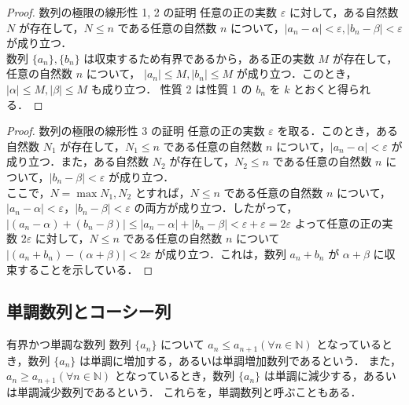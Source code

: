 \documentclass[a4paper]{ltjsarticle}
\begin{document}
  \begin{proof}{数列の極限の線形性 1, 2 の証明}{}
   任意の正の実数 $\varepsilon$ に対して，ある自然数 $N$ が存在して，$N \leq n$ である任意の自然数 $n$ について，$|a_n - \alpha| < \varepsilon, |b_n - \beta| < \varepsilon$ が成り立つ．
   \\
   数列 $\{a_n\}, \{b_n\}$ は収束するため有界であるから，ある正の実数 $M$ が存在して，任意の自然数 $n$ について， $|a_n| \leq M, |b_n| \leq M$ が成り立つ．このとき，$|\alpha| \leq M, |\beta| \leq M$ も成り立つ．
   性質 2 は性質 1 の $b_n$ を $k$ とおくと得られる．
  \end{proof}

  \begin{proof}{数列の極限の線形性 3 の証明}{}
   任意の正の実数 $\varepsilon$ を取る．このとき，ある自然数 $N_1$ が存在して，$N_1 \leq n$ である任意の自然数 $n$ について，$|a_n - \alpha| < \varepsilon$ が成り立つ．また，ある自然数 $N_2$ が存在して，$N_2 \leq n$ である任意の自然数 $n$ について，$|b_n - \beta| < \varepsilon$ が成り立つ．
   \\
   ここで，$N = \max {N_1, N_2}$ とすれば，$N \leq n$ である任意の自然数 $n$ について，$|a_n - \alpha| < \varepsilon，|b_n - \beta| < \varepsilon$ の両方が成り立つ．したがって，$|(a_n - \alpha) + (b_n - \beta)| \leq |a_n - \alpha| + |b_n - \beta| < \varepsilon + \varepsilon = 2\varepsilon$ よって任意の正の実数 $2\varepsilon$ に対して，$N \leq n$ である任意の自然数 $n$ について $|(a_n + b_n) - (\alpha + \beta)| < 2\varepsilon$ が成り立つ．これは，数列 ${a_n + b_n}$ が $\alpha + \beta$ に収束することを示している．
  \end{proof}

  \subsection{単調数列とコーシー列}
  \begin{tcb}{有界かつ単調な数列}{}
   数列 $\{a_n\}$ について $a_n \leq a_{n+1} (\forall n \in \mathbb{N})$ となっているとき，数列 $\{a_n\}$ は単調に増加する，あるいは単調増加数列であるという．
   また，$a_n \geq a_{n+1} (\forall n \in \mathbb{N})$ となっているとき，数列 $\{a_n\}$ は単調に減少する，あるいは単調減少数列であるという．
   これらを，単調数列と呼ぶこともある．

  \end{tcb}
\end{document}
